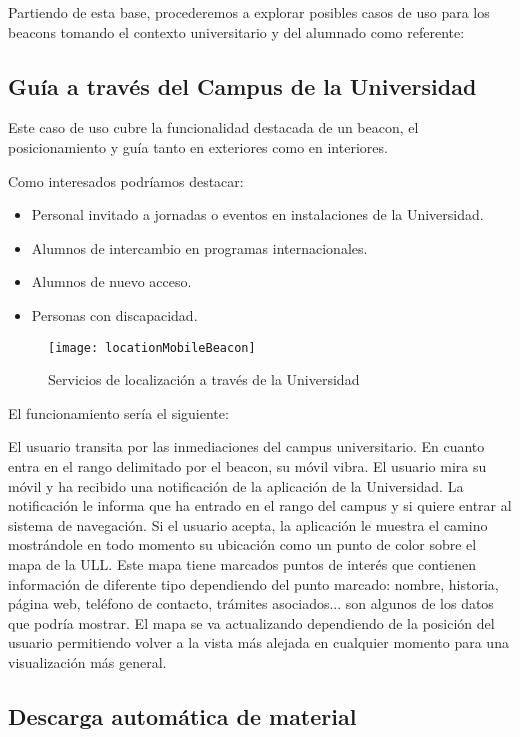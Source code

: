 Partiendo de esta base, procederemos a explorar posibles casos de uso para los beacons tomando el contexto universitario y del alumnado como referente:

\subsection{Guía a través del Campus de la Universidad}

Este caso de uso cubre la funcionalidad destacada de un beacon, el posicionamiento y guía tanto en exteriores como en interiores. 

Como interesados podríamos destacar: 

\begin{itemize}
\item Personal invitado a jornadas o eventos en instalaciones de la Universidad.
\item Alumnos de intercambio en programas internacionales.
\item Alumnos de nuevo acceso.
\item Personas con discapacidad.
\end{itemize}

\begin{figure}[h]
	\centering
	\texttt{[image: locationMobileBeacon]}
	\caption{Servicios de localización a través de la Universidad}
	\label{fig:beaconLocation}
\end{figure}

El funcionamiento sería el siguiente: 

El usuario transita por las inmediaciones del campus universitario. En cuanto entra en el rango delimitado por el beacon, su móvil vibra. El usuario mira su móvil y ha recibido una notificación de la aplicación de la Universidad. La notificación le informa que ha entrado en el rango del campus y si quiere entrar al sistema de navegación. Si el usuario acepta, la aplicación le muestra el camino mostrándole en todo momento su ubicación como un punto de color sobre el mapa de la ULL. Este mapa tiene marcados puntos de interés que contienen información de diferente tipo dependiendo del punto marcado: nombre, historia, página web, teléfono de contacto, trámites asociados... son algunos de los datos que podría mostrar. El mapa se va actualizando dependiendo de la posición del usuario permitiendo volver a la vista más alejada en cualquier momento para una visualización más general.


\subsection{Descarga automática de material}

